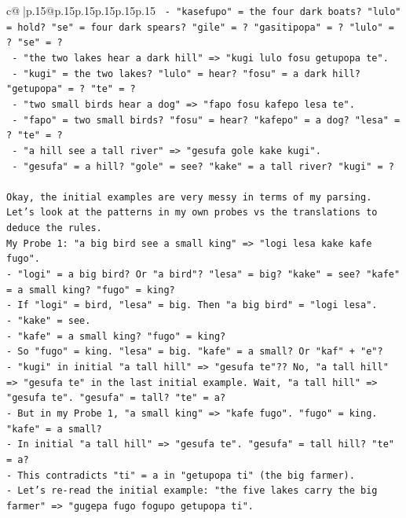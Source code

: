 \documentclass{article}
\begin{document}
{\begin{supertabular}{c@{$\;$}|p{.15\linewidth}@{}p{.15\linewidth}p{.15\linewidth}p{.15\linewidth}p{.15\linewidth}p{.15\linewidth}}
{{{\texttt{   {-} "kasefupo" = the four dark boats? "lulo" = hold? "se" = four dark spears? "gile" = ? "gasitipopa" = ? "lulo" = ? "se" = ?} \\
\texttt{   {-} "the two lakes hear a dark hill" => "kugi lulo fosu getupopa te".} \\
\texttt{   {-} "kugi" = the two lakes? "lulo" = hear? "fosu" = a dark hill? "getupopa" = ? "te" = ?} \\
\texttt{   {-} "two small birds hear a dog" => "fapo fosu kafepo lesa te".} \\
\texttt{   {-} "fapo" = two small birds? "fosu" = hear? "kafepo" = a dog? "lesa" = ? "te" = ?} \\
\texttt{   {-} "a hill see a tall river" => "gesufa gole kake kugi".} \\
\texttt{   {-} "gesufa" = a hill? "gole" = see? "kake" = a tall river? "kugi" = ?} \\
\\ 
\texttt{Okay, the initial examples are very messy in terms of my parsing. Let's look at the patterns in my own probes vs the translations to deduce the rules.} \\
\texttt{My Probe 1: "a big bird see a small king" => "logi lesa kake kafe fugo".} \\
\texttt{{-} "logi" = a big bird? Or "a bird"? "lesa" = big? "kake" = see? "kafe" = a small king? "fugo" = king?} \\
\texttt{{-} If "logi" = bird, "lesa" = big. Then "a big bird" = "logi lesa".} \\
\texttt{{-} "kake" = see.} \\
\texttt{{-} "kafe" = a small king? "fugo" = king?} \\
\texttt{{-} So "fugo" = king. "lesa" = big. "kafe" = a small? Or "kaf" + "e"?} \\
\texttt{{-} "kugi" in initial "a tall hill" => "gesufa te"?? No, "a tall hill" => "gesufa te" in the last initial example. Wait, "a tall hill" => "gesufa te". "gesufa" = tall? "te" = a?} \\
\texttt{{-} But in my Probe 1, "a small king" => "kafe fugo". "fugo" = king. "kafe" = a small?} \\
\texttt{{-} In initial "a tall hill" => "gesufa te". "gesufa" = tall hill? "te" = a?} \\
\texttt{{-} This contradicts "ti" = a in "getupopa ti" (the big farmer).} \\
\texttt{{-} Let's re{-}read the initial example: "the five lakes carry the big farmer" => "gugepa fugo fogupo getupopa ti".} \\
}}}
\end{supertabular}}
\end{document}
